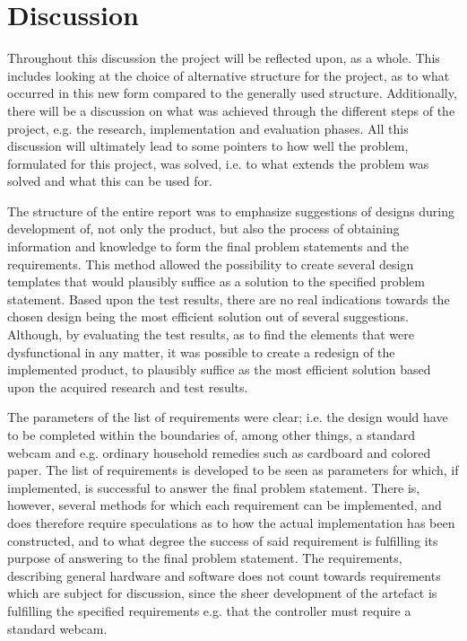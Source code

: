 \section{Discussion}

Throughout this discussion the project will be reflected upon, as a whole. This includes looking at the choice of alternative structure for the project, as to what occurred in this new form compared to the generally used structure. Additionally, there will be a discussion on what was achieved through the different steps of the project, e.g. the research, implementation and evaluation phases. All this discussion will ultimately lead to some pointers to how well the problem, formulated for this project, was solved, i.e. to what extends the problem was solved and what this can be used for.
\bigskip

The structure of the entire report was to emphasize suggestions of designs during development of, not only the product, but also the process of obtaining information and knowledge to form the final problem statements and the requirements. This method allowed the possibility to create several design templates that would plausibly suffice as a solution to the specified problem statement. Based upon the test results, there are no real indications towards the chosen design being the most efficient solution out of several suggestions. Although, by evaluating the test results, as to find the elements that were dysfunctional in any matter, it was possible to create a redesign of the implemented product, to plausibly suffice as the most efficient solution based upon the acquired research and test results.
\bigskip

The parameters of the list of requirements were clear; i.e. the design would have to be completed within the boundaries of, among other things, a standard webcam and e.g. ordinary household remedies such as cardboard and colored paper. The list of requirements is developed to be seen as parameters for which, if implemented, is successful to answer the final problem statement. There is, however, several methods for which each requirement can be implemented, and does therefore require speculations as to how the actual implementation has been constructed, and to what degree the success of said requirement is fulfilling its purpose of answering to the final problem statement. The requirements, describing general hardware and software does not count towards requirements which are subject for discussion, since the sheer development of the artefact is fulfilling the specified requirements e.g. that the controller must require a standard webcam.
\bigskip

